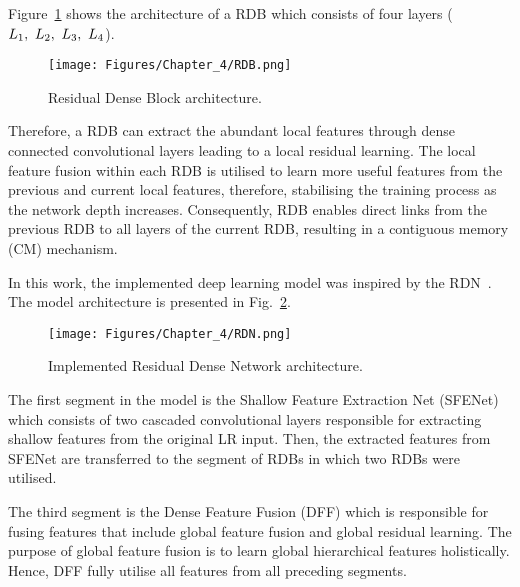 Figure~\ref{fig:RDB} shows the architecture of a RDB which consists of four  layers (\(L_1,\ L_2,\ L_3,\- \ L_4\)).
\begin{figure} [h!]
	\begin{center}
		\texttt{[image: Figures/Chapter\_4/RDB.png]}
	\end{center}
	\caption{Residual Dense Block architecture.} 
	\label{fig:RDB}
\end{figure}
Therefore, a RDB can extract the abundant local features through dense connected convolutional layers leading to a local residual learning.
The local feature fusion within each RDB is utilised to learn more useful features from the previous and current local features, therefore, stabilising the training process as the network depth increases.
Consequently, RDB enables direct links from the previous RDB to all layers of the current RDB, resulting in a contiguous memory (CM) mechanism.

In this work, the implemented deep learning model was inspired by the RDN~\cite{Zhang2018}. 
The model architecture is presented in Fig.~\ref{fig:RDN}.
\begin{figure} [h!]
	\begin{center}
		\texttt{[image: Figures/Chapter\_4/RDN.png]}
	\end{center}
	\caption{Implemented Residual Dense Network architecture.} 
	\label{fig:RDN}
\end{figure}
The first segment in the model is the Shallow Feature Extraction Net (SFENet) which consists of two cascaded convolutional layers responsible for extracting shallow features from the original LR input.
Then, the extracted features from SFENet are transferred to the segment of RDBs in which two RDBs were utilised.

The third segment is the Dense Feature Fusion (DFF) which is responsible for fusing features that include global feature fusion and global residual learning.
The purpose of global feature fusion is to learn global hierarchical features holistically.
Hence, DFF fully utilise all features from all preceding segments.

